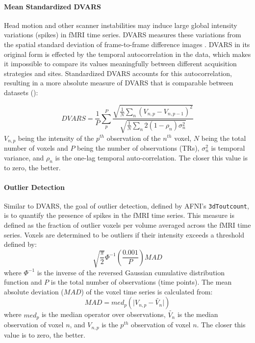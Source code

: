 \paragraph{Mean Standardized DVARS}
\label{sec:dvars}
Head motion and other scanner instabilities may induce large global intensity variations (spikes) in fMRI time series. DVARS measures these variations from the spatial standard deviation of frame-to-frame difference images  \citep{power2012}. DVARS in its original form is effected by the temporal autocorrelation in the data, which makes it impossible to compare its values meaningfully between different acquisition strategies and sites. Standardized DVARS accounts for this autocorrelation, resulting in a more absolute measure of DVARS that is comparable between datasets (\citep{Nichols2013}): 

\begin{equation}
DVARS = \frac{1}{P}\sum_{p}^P{\frac{\sqrt{\frac{1}{N} \sum_{n} (V_{n,p} - V_{n,p - 1})^2}}{\sqrt{\frac{1}{N} \sum_{n} 2(1 - \rho_{n})\sigma_{n}^2}}}
\end{equation}
$V_{n,p}$ being the intensity of the $p^{th}$ observation of the $n^{th}$ voxel, $N$ being the total number of voxels and $P$ being the number of observations (TRs), $\sigma_{n}^2$ is temporal variance, and $\rho_{n}$ is the one-lag temporal auto-correlation.  The closer this value is to zero, the better.

\paragraph{Outlier Detection}
\label{sec:13}
Similar to DVARS, the goal of outlier detection, defined by AFNI's \texttt{3dToutcount}, is to quantify the presence of spikes in the fMRI time series. This measure is defined as the fraction of outlier voxels per volume averaged across the fMRI time series. Voxels are determined to be outliers if their intensity exceeds a threshold defined by: 
\begin{equation} \label{outlier_eqn}
\sqrt{\frac{\pi}{2}} \Phi^{-1}\left(\frac{0.001}{P}\right)  MAD
\end{equation}
where $\Phi^{-1}$ is the inverse of the reversed Gaussian cumulative distribution function and $P$ is the total number of observations (time points). The mean absolute deviation ($MAD$) of the voxel time series is calculated from:
\begin{equation} \label{MAD_eqn}
MAD = {med}_p(\lvert V_{n,p} - \widetilde{V_n} \rvert )
\end{equation}
where ${med}_p$ is the median operator over observations, $\widetilde{V_n}$ is the median observation of voxel $n$, and $V_{n,p}$ is the $p^{th}$ observation of voxel ${n}$. The closer this value is to zero, the better.

